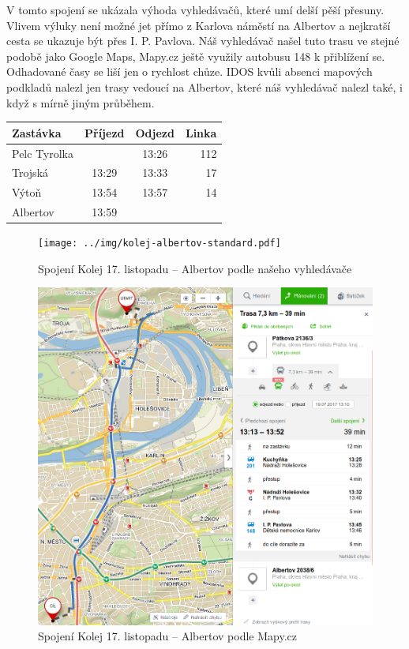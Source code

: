 V tomto spojení se ukázala výhoda vyhledávačů, které umí delší pěší přesuny.
Vlivem výluky není možné jet přímo z Karlova náměstí na Albertov a nejkratší
cesta se ukazuje být přes I. P. Pavlova. Náš vyhledávač našel tuto trasu ve
stejné podobě jako Google Maps, Mapy.cz ještě využily autobusu 148 k přiblížení
se. Odhadované časy se liší jen o rychlost chůze. IDOS kvůli absenci mapových
podkladů nalezl jen trasy vedoucí na Albertov, které náš vyhledávač nalezl také,
i když s mírně jiným průběhem. 

\begin{tabular}{|l|c|c|r|}\hline
{\bf Zastávka}&{\bf Příjezd}&{\bf Odjezd}&{\bf Linka}\\\hline
Pelc Tyrolka&&13:26&112\\\hline
Trojská&13:29&13:33&17\\\hline
Výtoň&13:54&13:57&14\\\hline
Albertov&13:59&&\\\hline
\end{tabular} 
\begin{figure}[h]
  \centering
    \texttt{[image: ../img/kolej-albertov-standard.pdf]}
  \caption{Spojení Kolej 17. listopadu -- Albertov podle našeho vyhledávače}
  \label{fig:kolej-albertov-osmawalk}
\end{figure}
\begin{figure}[h]
  \centering
    \includegraphics[width=\textwidth]{../img/kolej-albertov-seznam.png}
  \caption{Spojení Kolej 17. listopadu -- Albertov podle Mapy.cz}
  \label{fig:kolej-albertov-seznam}
\end{figure}
